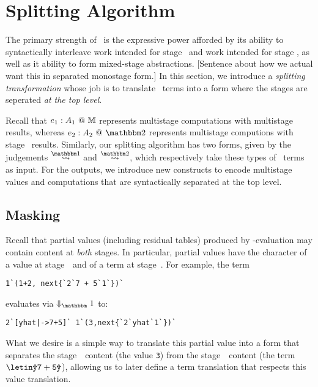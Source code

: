 
\section{Splitting Algorithm}
\label{sec:splitting}

\begin{abstrsyn}

The primary strength of \lang\ is the expressive power afforded by
its ability to syntactically interleave work intended for stage \bbone\
and work intended for stage \bbtwo, as well as it ability to form
mixed-stage abstractions.
[Sentence about how we actual want this in separated monostage form.]
In this section, we introduce a {\em splitting transformation} whose job 
is to translate \lang\ terms into a form where the stages are 
seperated {\em at the top level}.

Recall that ${e_1}:{A_1}~@~\mathbb{M}$ represents multistage computations with multistage results,
whereas $\coltwo {e_2}{A_2}$ represents multistage computions with stage \bbtwo\ results.
Similarly, our splitting algorithm has two forms, 
given by the judgements $\splitonesym$ and $\splittwosym$, 
which respectively take these types of \lang\ terms as input.
For the outputs, we introduce new constructs 
to encode multistage values and computations that are syntactically separated at the top level.

\subsection{Masking}

Recall that partial values (including residual tables) produced by \bbone-evaluation may
contain content at \emph{both} stages. 
In particular, partial values have the character of a value at stage~\bbone\ and of a term at stage~\bbtwo.
For example, the term
\begin{lstlisting}
1`(1+2, next{`2`7 + 5`1`})`
\end{lstlisting}
evaluates via $\redonesym$ to:
\begin{lstlisting}
2`[yhat|->7+5]` 1`(3,next{`2`yhat`1`})`
\end{lstlisting}

What we desire is a simple way to translate this partial value into a form that separates the stage~\bbone\ content (the value \texttt{3}) 
from the stage~\bbtwo\ content (the term $\letin \yhat {\mathtt{7+5}} \yhat$),
allowing us to later define a term translation that respects this value translation.


\end{abstrsyn}
